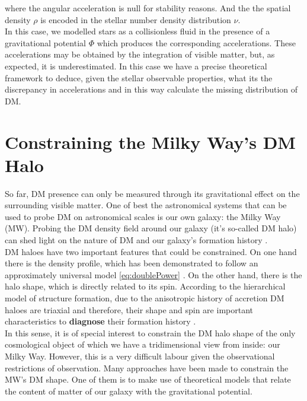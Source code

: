 where the angular acceleration is null for stability reasons. And the the spatial density $\rho$ is encoded in the stellar number density distribution $\nu$.\\

In this case, we modelled stars as a collisionless fluid in the presence of a gravitational potential $\Phi$ which produces the corresponding accelerations. These accelerations may be obtained by the integration of visible matter, but, as expected, it is underestimated. In this case we have a precise theoretical framework to deduce, given the stellar observable properties, what its the discrepancy in accelerations and in this way calculate the missing distribution of DM.\\


\section{Constraining the Milky Way's DM Halo}
So far, DM presence can only be measured through its gravitational effect on the surrounding visible matter. 
One of best the astronomical systems that can be used to probe DM on astronomical scales is our own galaxy: the Milky Way (MW).
Probing the DM density field around our galaxy (it's so-called DM halo) can shed light on the nature of DM \cite{Nipoti,ReadMoore} and our
galaxy's formation history \cite{Read1,Read2,Vera-Ciro2011}.\\

DM haloes have two important features that could be constrained. 
On one hand there is the density profile, which has been demonstrated to follow an approximately universal model \eqref{eq:doublePower} \cite{Navarro et al. 2010}. 
On the other hand, there is the halo shape, which is directly related to its spin. 
According to the hierarchical model of structure formation, due to the anisotropic history of accretion DM haloes are triaxial and therefore, their shape and spin are important characteristics to \textbf{diagnose} their formation history \cite{Bardeen et al. 1986}.\\

In this sense, it is of special interest to constrain the DM halo shape of the only cosmological object of which we have a tridimensional view from inside: our Milky Way. However, this is a very difficult labour given the observational restrictions of observation. Many approaches have been made to constrain the MW's DM shape. One of them is to make use of theoretical models that relate the content of matter of our galaxy with the gravitational potential.\\


